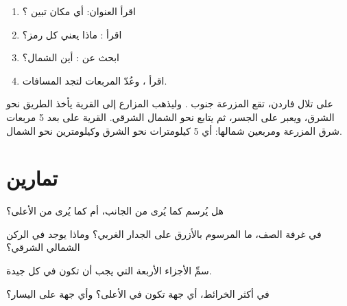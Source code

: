 \begin{method}\label{met:g2:drawing-to-map:read}
\begin{enumerate}
  \item اقرأ العنوان: أي مكان تبين ؟
  \item اقرأ : ماذا يعني كل رمز؟
  \item ابحث عن : أين الشمال؟
  \item اقرأ ، وعُدّ المربعات لتجد المسافات.
\end{enumerate}
\end{method}

\begin{example}\label{ex:g2:drawing-to-map:farm}
على  تلال فاردن، تقع المزرعة جنوب . وليذهب المزارع إلى القرية
يأخذ الطريق نحو الشرق، ويعبر  على الجسر، ثم يتابع نحو الشمال
الشرقي. القرية على بعد 5 مربعات شرق المزرعة ومربعين شمالها: أي
5 كيلومترات نحو الشرق وكيلومترين
نحو الشمال.
\end{example}

\section{تمارين}

\begin{exercise}[$\star$]\label{exo:g2:drawing-to-map:1}
هل يُرسم  كما يُرى من الجانب، أم كما يُرى من الأعلى؟
\end{exercise}

\begin{exercise}[$\star$]\label{exo:g2:drawing-to-map:2}
في  غرفة الصف، ما المرسوم بالأزرق على الجدار الغربي؟ وماذا يوجد في
الركن الشمالي الشرقي؟
\end{exercise}

\begin{exercise}[$\star$]\label{exo:g2:drawing-to-map:3}
سمِّ الأجزاء الأربعة التي يجب أن تكون في كل  جيدة.
\end{exercise}

\begin{exercise}[$\star$]\label{exo:g2:drawing-to-map:4}
في أكثر الخرائط، أي جهة تكون في الأعلى؟ وأي جهة على اليسار؟
\end{exercise}

